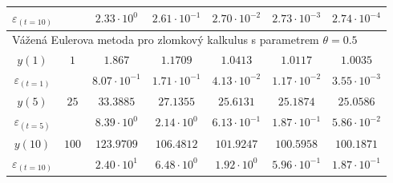 \documentclass[a4paper,12pt,twoside]{article}
\theoremstyle{definition}
\theoremstyle{remark}
\numberwithin{equation}{section}
\numberwithin{table}{section}
\numberwithin{figure}{section}
\begin{document}
\begin{table}[h!]
\begin{tabular}{|c||c|c|c|c|c|c|}
		\hline
		$\varepsilon_{\left(t=10\right)}$ & & $ 2.33 \cdot 10^{0}$ & $2.61 \cdot 10^{-1}$ & $2.70 \cdot 10^{-2}$ & $2.73\cdot 10^{-3}$ & $2.74 \cdot 10^{-4}$ \\
		\hline\hline
		\multicolumn{7}{|l|}{Vážená Eulerova metoda pro zlomkový kalkulus s parametrem $\theta = 0.5$} \\
		\hline
		$y\left(1\right)$ & $1$ & $1.867$ & $1.1709$ & $1.0413$ & $1.0117$ & $1.0035$  \\
		\hline
		$\varepsilon_{\left(t=1\right)}$ &  & $8.07 \cdot 10^{-1}$ & $1.71 \cdot 10^{-1}$ & $4.13 \cdot 10^{-2}$ & $1.17\cdot 10^{-2}$ & $3.55\cdot 10^{-3}$ \\
		\hline
		$y\left(5\right)$ & $25$ & $33.3885$ & $27.1355$ & $25.6131$ & $25.1874$ & $25.0586$  \\
		\hline
		$\varepsilon_{\left(t=5\right)}$ & & $ 8.39 \cdot 10^{0}$ & $2.14 \cdot 10^{0}$ & $6.13 \cdot 10^{-1}$ & $1.87\cdot 10^{-1}$ & $5.86 \cdot 10^{-2}$ \\
		\hline
		$y\left(10\right)$ & $100$ & $123.9709$ & $106.4812$ & $101.9247$ & $100.5958$ & $100.1871$  \\
		\hline
		$\varepsilon_{\left(t=10\right)}$ & & $ 2.40 \cdot 10^{1}$ & $6.48 \cdot 10^{0}$ & $1.92 \cdot 10^{0}$ & $5.96\cdot 10^{-1}$ & $1.87 \cdot 10^{-1}$ \\
		\hline
	\end{tabular}
\end{table}
\end{document}
